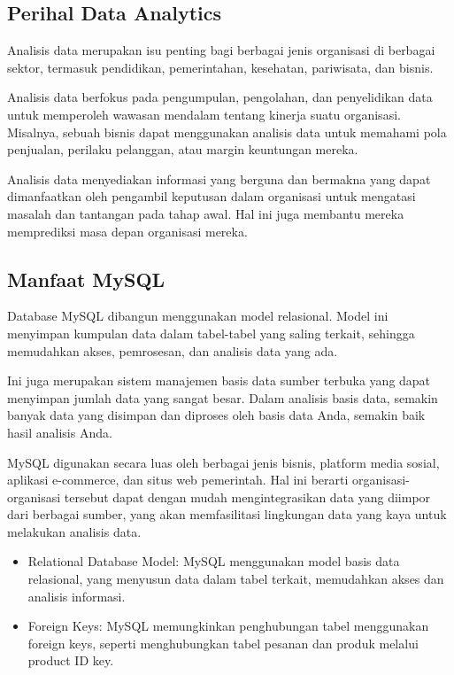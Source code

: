 \documentclass{article}
\begin{document}
\subsection{Perihal Data Analytics}
Analisis data merupakan isu penting bagi berbagai jenis organisasi di berbagai sektor, termasuk pendidikan, pemerintahan, kesehatan, pariwisata, dan bisnis.

Analisis data berfokus pada pengumpulan, pengolahan, dan penyelidikan data untuk memperoleh wawasan mendalam tentang kinerja suatu organisasi. Misalnya, sebuah bisnis dapat menggunakan analisis data untuk memahami pola penjualan, perilaku pelanggan, atau margin keuntungan mereka.

Analisis data menyediakan informasi yang berguna dan bermakna yang dapat dimanfaatkan oleh pengambil keputusan dalam organisasi untuk mengatasi masalah dan tantangan pada tahap awal. Hal ini juga membantu mereka memprediksi masa depan organisasi mereka.

\subsection{Manfaat MySQL}
Database MySQL dibangun menggunakan model relasional. Model ini menyimpan kumpulan data dalam tabel-tabel yang saling terkait, sehingga memudahkan akses, pemrosesan, dan analisis data yang ada.

Ini juga merupakan sistem manajemen basis data sumber terbuka yang dapat menyimpan jumlah data yang sangat besar. Dalam analisis basis data, semakin banyak data yang disimpan dan diproses oleh basis data Anda, semakin baik hasil analisis Anda.

MySQL digunakan secara luas oleh berbagai jenis bisnis, platform media sosial, aplikasi e-commerce, dan situs web pemerintah. Hal ini berarti organisasi-organisasi tersebut dapat dengan mudah mengintegrasikan data yang diimpor dari berbagai sumber, yang akan memfasilitasi lingkungan data yang kaya untuk melakukan analisis data.

\begin{itemize}
    \item Relational Database Model: MySQL menggunakan model basis data relasional, yang menyusun data dalam tabel terkait, memudahkan akses dan analisis informasi.
    \item Foreign Keys: MySQL memungkinkan penghubungan tabel menggunakan foreign keys, seperti menghubungkan tabel pesanan dan produk melalui product ID key.
\end{itemize}
\end{document}
